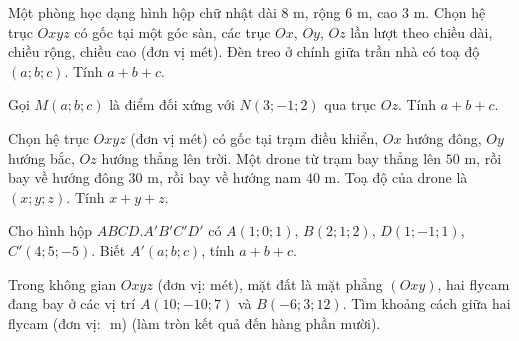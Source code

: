 \begin{bai}Một phòng học dạng hình hộp chữ nhật dài $8$ m, rộng $6$ m, cao $3$ m. Chọn hệ trục $Oxyz$ có gốc tại một góc sàn, các trục $Ox$, $Oy$, $Oz$ lần lượt theo chiều dài, chiều rộng, chiều cao (đơn vị mét). Đèn treo ở chính giữa trần nhà có toạ độ $(a;b;c)$. Tính $a+b+c$.\otraloi{}\end{bai}
\begin{bai}Gọi $M(a;b;c)$ là điểm đối xứng với $N(3;-1;2)$ qua trục $Oz$. Tính $a+b+c$.\otraloi{}\end{bai}
\begin{bai}Chọn hệ trục $Oxyz$ (đơn vị mét) có gốc tại trạm điều khiển, $Ox$ hướng đông, $Oy$ hướng bắc, $Oz$ hướng thẳng lên trời. Một drone từ trạm bay thẳng lên $50$ m, rồi bay về hướng đông $30$ m, rồi bay về hướng nam $40$ m. Toạ độ của drone là $(x;y;z)$. Tính $x+y+z$.\otraloi{}\end{bai}
\begin{bai}Cho hình hộp $ABCD.A'B'C'D'$ có $A(1;0;1)$, $B(2;1;2)$, $D(1;-1;1)$, $C'(4;5;-5)$. Biết $A'(a;b;c)$, tính $a+b+c$.\otraloi{}\end{bai}
\begin{bai}Trong không gian $Oxyz$ (đơn vị: mét), mặt đất là mặt phẳng $(Oxy)$, hai flycam đang bay ở các vị trí $A(10;-10;7)$ và $B(-6;3;12)$. Tìm khoảng cách giữa hai flycam (đơn vị: $\text{ m}$) (làm tròn kết quả đến hàng phần mười).
\otraloi
{}\end{bai}
